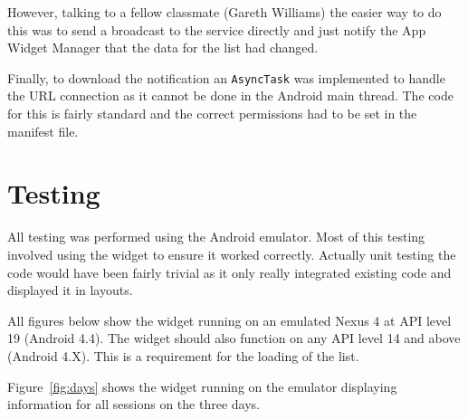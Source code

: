 \documentclass[11pt, a4paper]{article}
\begin{document}
However, talking to a fellow classmate (Gareth Williams) the easier way to do
this was to send a broadcast to the service directly and just notify the App
Widget Manager that the data for the list had changed.

Finally, to download the notification an \texttt{AsyncTask} was implemented to
handle the URL connection as it cannot be done in the Android main thread. The
code for this is fairly standard and the correct permissions had to be set in
the manifest file.


\section{Testing}
All testing was performed using the Android emulator. Most of this testing
involved using the widget to ensure it worked correctly. Actually unit testing
the code would have been fairly trivial as it only really integrated existing
code and displayed it in layouts.

All figures below show the widget running on an emulated Nexus 4 at API level 
19 (Android 4.4). The widget should also function on any API level 14 and above
(Android 4.X). This is a requirement for the loading of the list.

Figure~\ref{fig:days} shows the widget running on the emulator displaying 
information for all sessions on the three days. 
\end{document}
